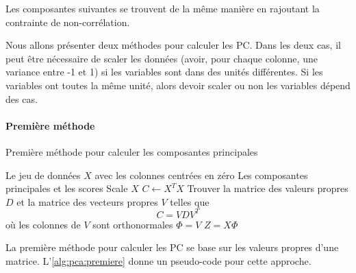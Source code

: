             Les composantes suivantes se trouvent de la même manière en rajoutant la contrainte de non-corrélation.

            Nous allons présenter deux méthodes pour calculer les PC. Dans les deux cas, il peut être nécessaire de scaler les données (avoir, pour chaque colonne, une variance entre -1 et 1) si les variables sont dans des unités différentes. Si les variables ont toutes la même unité, alors devoir scaler ou non les variables dépend des cas.

            \paragraph{Première méthode}
                \begin{algorithm}
                    \caption{Première méthode pour calculer les composantes principales}
                    \label{alg:pca:premiere}
                    \begin{algorithmic}[1]
                        \Require Le jeu de données \(X\) avec les colonnes centrées en zéro
                        \Ensure Les composantes principales et les scores
                        \Statex
                        \State Scale \(X\)
                        \State \(C \gets X^T X\) 
                        \State Trouver la matrice des valeurs propres \(D\) et la matrice des vecteurs propres \(V\) telles que
                        \[
                            C = VDV^T
                        \]
                        où les colonnes de \(V\) sont orthonormales 
                        \State \(\Phi = V\) 
                        \State \(Z = X\Phi\) 
                    \end{algorithmic}
                \end{algorithm}

                La première méthode pour calculer les PC se base sur les valeurs propres d'une matrice. L'\cref{alg:pca:premiere} donne un pseudo-code pour cette approche.

